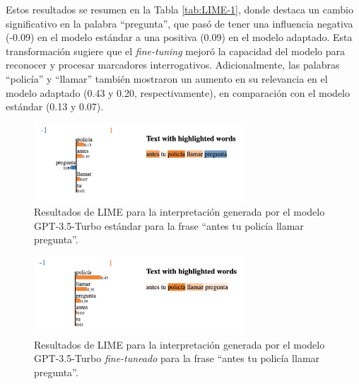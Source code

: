 Estos resultados se resumen en la Tabla \ref{tab:LIME-1}, donde destaca un cambio significativo en la palabra “pregunta”, que pasó de tener una influencia negativa (-0.09) en el modelo estándar a una positiva (0.09) en el modelo adaptado. Esta transformación sugiere que el \textit{fine-tuning} mejoró la capacidad del modelo para reconocer y procesar marcadores interrogativos. Adicionalmente, las palabras “policía” y “llamar” también mostraron un aumento en su relevancia en el modelo adaptado (0.43 y 0.20, respectivamente), en comparación con el modelo estándar (0.13 y 0.07). 

\begin{figure}[H]
\centering
    \includegraphics[width=0.7\textwidth]{figuras/LIME/LIME-O1.png}
    \caption{Resultados de LIME para la interpretación generada por el modelo GPT-3.5-Turbo estándar para la frase “antes tu policía llamar pregunta”.}
    \label{fig:LIME-O1}
\end{figure}

\begin{figure}[H]
\centering
    \includegraphics[width=0.7\textwidth]{figuras/LIME/LIME-F1.png}
    \caption{Resultados de LIME para la interpretación generada por el modelo GPT-3.5-Turbo \textit{fine-tuneado} para la frase “antes tu policía llamar pregunta”.}
    \label{fig:LIME-F1}
\end{figure}


